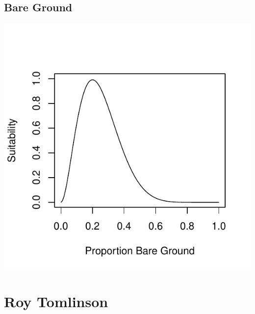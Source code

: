 \documentclass[12pt,letterpaper]{article}\usepackage{graphicx, color}
\makeatletter
\def\maxwidth{ %
  \ifdim\Gin@nat@width>\linewidth
    \linewidth
  \else
    \Gin@nat@width
  \fi
}
\newenvironment{knitrout}{}{} %
\makeatother
\begin{document}
\subsection{Bare Ground}
\begin{knitrout}
\color{fgcolor}\includegraphics[width=\maxwidth]{figure/Sally-Dan_Bare_Ground} 
\end{knitrout}




\section{Roy Tomlinson}
\end{document}

